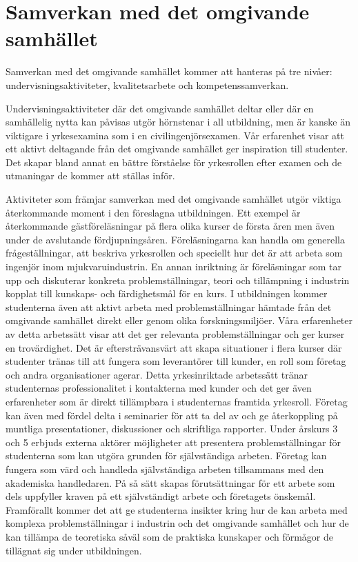 \section{Samverkan med det omgivande samhället}

Samverkan med det omgivande samhället kommer att hanteras på tre nivåer: undervisningsaktiviteter, kvalitetsarbete och kompetenssamverkan.

Undervisningsaktiviteter där det omgivande samhället deltar eller där en samhällelig nytta kan påvisas utgör hörnstenar i all utbildning, men är kanske än viktigare i yrkesexamina som i en civilingenjörsexamen. Vår erfarenhet visar att ett aktivt deltagande från det omgivande samhället ger inspiration till studenter. Det skapar bland annat en bättre förståelse för yrkesrollen efter examen och de utmaningar de kommer att ställas inför.

Aktiviteter som främjar samverkan med det omgivande samhället utgör viktiga återkommande moment i den föreslagna utbildningen. Ett exempel är återkommande gästföreläsningar på flera olika kurser de första åren men även under de avslutande fördjupningsåren. Föreläsningarna kan handla om generella frågeställningar, att beskriva yrkesrollen och speciellt hur det är att arbeta som ingenjör inom mjukvaruindustrin. En annan inriktning är föreläsningar som tar upp och diskuterar konkreta problemställningar, teori och tillämpning i industrin kopplat till kunskaps- och färdighetsmål för en kurs. I utbildningen kommer studenterna även att aktivt arbeta med problemställningar hämtade från det omgivande samhället direkt eller genom olika forskningsmiljöer. Våra erfarenheter av detta arbetssätt visar att det ger relevanta problemställningar och ger kurser en trovärdighet. Det är eftersträvansvärt att skapa situationer i flera kurser där studenter tränas till att fungera som leverantörer till kunder, en roll som företag och andra organisationer agerar. Detta yrkesinriktade arbetssätt tränar studenternas professionalitet i kontakterna med kunder och det ger även erfarenheter som är direkt tillämpbara i studenternas framtida yrkesroll. Företag kan även med fördel delta i seminarier för att ta del av och ge återkoppling på muntliga presentationer, diskussioner och skriftliga rapporter. Under årskurs 3 och 5 erbjuds externa aktörer möjligheter att presentera problemställningar för studenterna som kan utgöra grunden för självständiga arbeten. Företag kan fungera som värd och handleda självständiga arbeten tillsammans med den akademiska handledaren. På så sätt skapas förutsättningar för ett arbete som dels uppfyller kraven på ett självständigt arbete och företagets önskemål. Framförallt kommer det att ge studenterna insikter kring hur de kan arbeta med komplexa problemställningar i industrin och det omgivande samhället och hur de kan tillämpa de teoretiska såväl som de praktiska kunskaper och förmågor de tillägnat sig under utbildningen.

